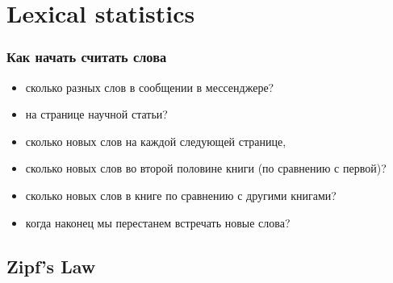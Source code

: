 \documentclass[svgnames]{beamer}
\begin{document}




\section{Lexical statistics}

\begin{frame}
  \frametitle{Как начать считать слова}
  \begin{itemize}[<+->]
  \item сколько разных слов в сообщении в
    мессенджере?
  \item на странице научной статьи?
  \item сколько новых слов на каждой следующей
  странице,
  \item сколько новых слов во второй половине книги (по
    сравнению с первой)?
  \item сколько новых слов в книге по сравнению
  с другими книгами? 
  \item когда наконец мы перестанем встречать новые слова?
  \end{itemize}
\end{frame}

\subsection{Zipf's Law}
\end{document}

